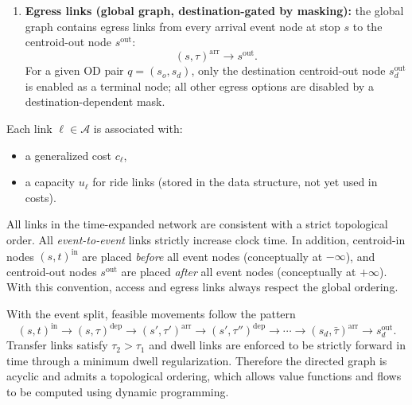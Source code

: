 \begin{definition}[Links]
\begin{enumerate}
\item \textbf{Egress links (global graph, destination-gated by masking):}
      the global graph contains egress links from every arrival event node at stop $s$
      to the centroid-out node $s^{\mathrm{out}}$:
      \[
      (s,\tau)^{\mathrm{arr}} \rightarrow s^{\mathrm{out}}.
      \]
      For a given OD pair $q=(s_o,s_d)$, only the destination centroid-out node $s_d^{\mathrm{out}}$
      is enabled as a terminal node; all other egress options are disabled by a destination-dependent mask.
\end{enumerate}
\end{definition}

Each link $\ell\in\mathcal{A}$ is associated with:
\begin{itemize}
\item a generalized cost $c_\ell$,
\item a capacity $u_\ell$ for ride links (stored in the data structure, not yet used in costs).
\end{itemize}

\begin{assumption}
All links in the time-expanded network are consistent with a strict
topological order. All \emph{event-to-event} links strictly increase
clock time. In addition, centroid-in nodes $(s,t)^{\mathrm{in}}$ are
placed \emph{before} all event nodes (conceptually at $-\infty$), and
centroid-out nodes $s^{\mathrm{out}}$ are placed \emph{after} all event
nodes (conceptually at $+\infty$). With this convention, access and
egress links always respect the global ordering.

With the event split, feasible movements follow the pattern
\[
(s,t)^{\mathrm{in}}
\rightarrow (s,\tau)^{\mathrm{dep}}
\rightarrow (s',\tau')^{\mathrm{arr}}
\rightarrow (s',\tau'')^{\mathrm{dep}}
\rightarrow \cdots
\rightarrow (s_d,\bar{\tau})^{\mathrm{arr}}
\rightarrow s_d^{\mathrm{out}}.
\]
Transfer links satisfy $\tau_2>\tau_1$ and dwell links are enforced to be strictly forward in time
through a minimum dwell regularization. Therefore the directed graph is acyclic and admits
a topological ordering, which allows value functions and flows to be computed using dynamic programming.
\end{assumption}

